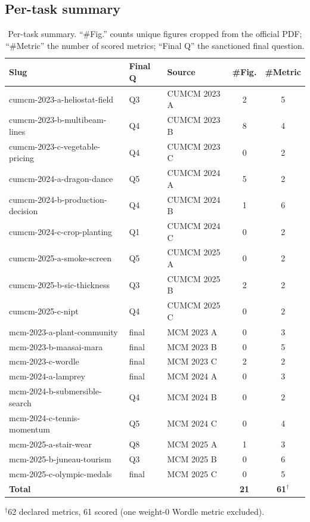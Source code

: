 \subsection{Per-task summary}
\begin{table}[h]
\centering
\small
\caption{Per-task summary. ``\#Fig.'' counts unique figures cropped from the official PDF; ``\#Metric'' the number of scored metrics; ``Final Q'' the sanctioned final question.}
\label{tab:dataset}
\begin{tabular}{@{}lllcc@{}}
\toprule
Slug & Final Q & Source & \#Fig. & \#Metric \\
\midrule
cumcm-2023-a-heliostat-field   & Q3 & CUMCM 2023 A & 2 & 5 \\
cumcm-2023-b-multibeam-lines   & Q4 & CUMCM 2023 B & 8 & 4 \\
cumcm-2023-c-vegetable-pricing & Q4 & CUMCM 2023 C & 0 & 2 \\
cumcm-2024-a-dragon-dance      & Q5 & CUMCM 2024 A & 5 & 2 \\
cumcm-2024-b-production-decision& Q4 & CUMCM 2024 B & 1 & 6 \\
cumcm-2024-c-crop-planting     & Q1 & CUMCM 2024 C & 0 & 2 \\
cumcm-2025-a-smoke-screen      & Q5 & CUMCM 2025 A & 0 & 2 \\
cumcm-2025-b-sic-thickness     & Q3 & CUMCM 2025 B & 2 & 2 \\
cumcm-2025-c-nipt              & Q4 & CUMCM 2025 C & 0 & 2 \\
mcm-2023-a-plant-community     & final & MCM 2023 A & 0 & 3 \\
mcm-2023-b-maasai-mara         & final & MCM 2023 B & 0 & 5 \\
mcm-2023-c-wordle              & final & MCM 2023 C & 2 & 2 \\
mcm-2024-a-lamprey             & final & MCM 2024 A & 0 & 3 \\
mcm-2024-b-submersible-search  & Q4 & MCM 2024 B & 0 & 2 \\
mcm-2024-c-tennis-momentum     & Q5 & MCM 2024 C & 0 & 4 \\
mcm-2025-a-stair-wear          & Q8 & MCM 2025 A & 1 & 3 \\
mcm-2025-b-juneau-tourism      & Q3 & MCM 2025 B & 0 & 6 \\
mcm-2025-c-olympic-medals      & final & MCM 2025 C & 0 & 5 \\
\midrule
\textbf{Total} & & & \textbf{21} & \textbf{61}$^{\dagger}$ \\
\bottomrule
\end{tabular}
\end{table}
$^{\dagger}$62 declared metrics, 61 scored (one weight-0 Wordle metric excluded).

